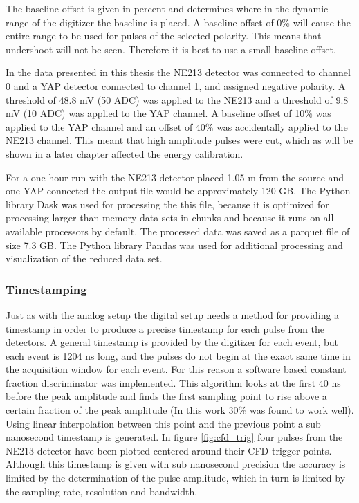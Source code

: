 \documentclass[main.tex]{subfiles}
\begin{document}
The baseline offset is given in percent and determines where in the dynamic range of the digitizer the baseline is placed. A baseline offset of 0\% will cause the entire range to be used for pulses of the selected polarity. This means that undershoot will not be seen. Therefore it is best to use a small baseline offset.

In the data presented in this thesis the NE213 detector was connected to channel 0 and a YAP detector connected to channel 1, and assigned negative polarity. A threshold of 48.8 mV (50 ADC) was applied to the NE213 and a threshold of 9.8 mV (10 ADC) was applied to the YAP channel. A baseline offset of 10\% was applied to the YAP channel and an offset of 40\% was accidentally applied to the NE213 channel. This meant that high amplitude pulses were cut, which as will be shown in a later chapter affected the energy calibration.

For a one hour run with the NE213 detector placed 1.05 m from the source and one YAP connected the output file would be approximately 120 GB. The Python library Dask was used for processing the this file, because it is optimized for processing larger than memory data sets in chunks and because it runs on all available processors by default\cite{Dask}. The processed data was saved as a parquet file of size 7.3 GB. The Python library Pandas was used for additional processing and visualization of the reduced data set\cite{Pandas}.

\subsubsection{Timestamping}
Just as with the analog setup the digital setup needs a method for providing a timestamp in order to produce a precise timestamp for each pulse from the detectors. A general timestamp is provided by the digitizer for each event, but each event is 1204 ns long, and the pulses do not begin at the exact same time in the acquisition window for each event. For this reason a software based constant fraction discriminator was implemented. This algorithm looks at the first 40 ns before the peak amplitude and finds the first sampling point to rise above  a certain fraction of the peak amplitude (In this work 30\% was found to work well). Using linear interpolation between this point and the previous point a sub nanosecond timestamp is generated. In figure \ref{fig:cfd_trig} four pulses from the NE213 detector have been plotted centered around their CFD trigger points. Although this timestamp is given with sub nanosecond precision the accuracy is limited by the determination of the pulse amplitude, which in turn is limited by the sampling rate, resolution and bandwidth. 
\end{document}
